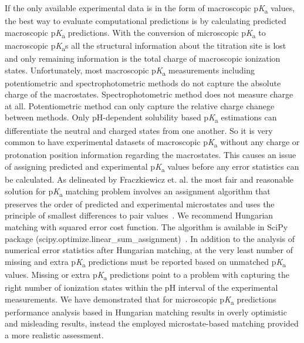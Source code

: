 \documentclass[9pt,lineno,final]{elife}
\newcommand{\pKa}{p\textit{K}\textsubscript{a}}
\begin{document}
If the only available experimental data is in the form of macroscopic \pKa{} values, the best way to evaluate computational predictions is by calculating predicted macroscopic \pKa{} predictions. With the conversion of microscopic \pKa{} to macroscopic \pKa{}s all the structural information about the titration site is lost and only remaining information is the total charge of macroscopic ionization states. Unfortunately, most macroscopic \pKa{} measurements including potentiometric and spectrophotometric methods do not capture the absolute charge of the macrostates. Spectrophotometric method does not measure charge at all. Potentiometric method can only capture the relative charge chanege between methods.  Only pH-dependent solubility based \pKa{} estimations can differentiate the neutral and charged states from one another. So it is very common to have experimental datasets of macroscopic \pKa{} without any charge or protonation position information regarding the macrostates.
This causes an issue of assigning predicted and experimental \pKa{} values before any error statistics can be calculated.
As delineated by Fraczkiewicz et. al. the most fair and reasonable solution for \pKa{} matching problem involves an assignment algorithm that preserves the order of predicted and experimental microstates and uses the principle of smallest differences to pair values~\citep{Fraczkiewicz:2013:ReferenceModuleinChemistryMolecularSciencesandChemicalEngineering}. We recommend Hungarian matching with squared error cost function. The algorithm is available in SciPy package (scipy.optimize.linear\_sum\_assignment)~\citep{SciPy-linear-sum-assignment}.
In addition to the analysis of numerical error statistics after Hungarian matching, at the very least number of missing and extra \pKa{} predictions must be reported based on unmatched \pKa{} values. Missing or extra \pKa{} predictions point to a problem with capturing the right number of ionization states within the pH interval of the experimental measurements. We have demonstrated that for microscopic \pKa{} predictions performance analysis based in Hungarian matching results in overly optimistic and misleading results, instead the employed microstate-based matching provided a more realistic assessment. 
\end{document}
